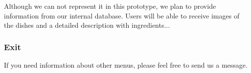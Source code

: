 Although we can not represent it in this prototype, we plan to provide information from our internal database. Users will be able to receive images of the dishes and a detailed description with ingredients...

\subsubsection{Exit}
If you need information about other menus, please feel free to send us a message.